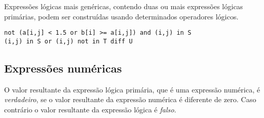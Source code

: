 \documentclass[11pt, brazil]{report}
\def\para#1{\noindent{\bf#1}}
\begin{document}

Expressões lógicas mais genéricas, contendo duas ou mais
expressões lógicas primárias, podem ser construídas usando
determinados operadores lógicos.

\para{Exemplos}

\begin{verbatim}
not (a[i,j] < 1.5 or b[i] >= a[i,j]) and (i,j) in S
(i,j) in S or (i,j) not in T diff U
\end{verbatim}

%
%
\vspace*{-8pt}

\subsection{Expressões numéricas}

O valor resultante da expressão lógica primária, que é uma
expressão numérica, é {\it verdadeiro}, se o valor resultante da
expressão numérica é diferente de zero. Caso contrário o valor resultante
da expressão lógica é {\it falso}.

\end{document}
